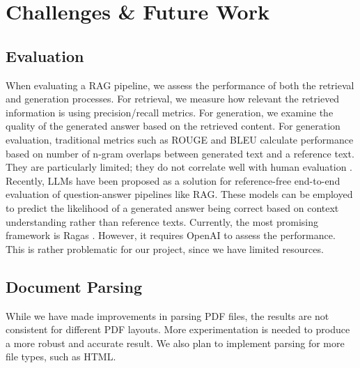 \documentclass{scrartcl}
\begin{document}

\section{Challenges \& Future Work}

\subsection{Evaluation}
\newline
When evaluating a RAG pipeline, we assess the performance of both the retrieval and generation processes. For retrieval, we measure how relevant the retrieved information is using precision/recall metrics. For generation, we examine the quality of the generated answer based on the retrieved content.
\newline\newline
For generation evaluation, traditional metrics such as ROUGE and BLEU calculate performance based on number of n-gram overlaps between generated text and a reference text. They are particularly limited; they do not correlate well with human evaluation \cite{sai2020survey}. Recently, LLMs have been proposed as a solution for reference-free end-to-end evaluation of question-answer pipelines like RAG. These models can be employed to predict the likelihood of a generated answer being correct based on context understanding rather than reference texts.
\newline
\newline
Currently, the most promising framework is Ragas \cite{es2023ragas}. However, it requires \mbox{OpenAI} to assess the performance. This is rather problematic for our project, since we have limited resources.

\subsection{Document Parsing}
\newline
While we have made improvements in parsing PDF files, the results are not consistent for different PDF layouts. More experimentation is needed to produce a more robust and accurate result. We also plan to implement parsing for more file types, such as HTML.
\end{document}
